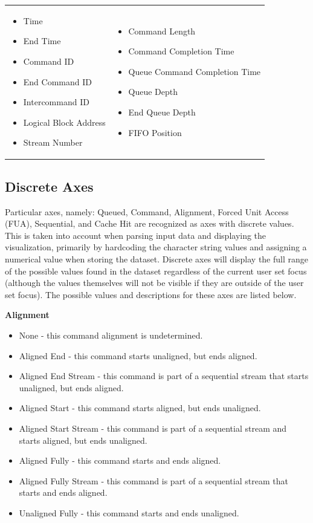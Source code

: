 \documentclass[journal]{vgtc}                %
\begin{document}
\begin{tabular}{p{}p{}}
\begin{itemize}
\item Time
\item End Time
\item Command ID
\item End Command ID
\item Intercommand ID
\item Logical Block Address
\item Stream Number
\end{itemize}
&
\begin{itemize}
\item Command Length
\item Command Completion Time
\item Queue Command Completion Time
\item Queue Depth
\item End Queue Depth
\item FIFO Position
\end{itemize}
\end{tabular}

\subsection{Discrete Axes}
Particular axes, namely: Queued, Command, Alignment, Forced Unit Access (FUA), Sequential, and Cache Hit are recognized as axes with discrete values. This is taken into account when parsing input data and displaying the visualization, primarily by hardcoding the character string values and assigning a numerical value when storing the dataset. Discrete axes will display the full range of the possible values found in the dataset regardless of the current user set focus (although the values themselves will not be visible if they are outside of the user set focus). The possible values and descriptions for these axes are listed below.

\noindent \textbf{Alignment}
\begin{itemize}
\item None - this command alignment is undetermined.
\item Aligned End - this command starts unaligned, but ends aligned.
\item Aligned End Stream - this command is part of a sequential stream that starts unaligned, but ends aligned.
\item Aligned Start - this command starts aligned, but ends unaligned.
\item Aligned Start Stream - this command is part of a sequential stream and starts aligned, but ends unaligned.
\item Aligned Fully - this command starts and ends aligned.
\item Aligned Fully Stream - this command is part of a sequential stream that starts and ends aligned.
\item Unaligned Fully - this command starts and ends unaligned.
\end{itemize}
\end{document}
